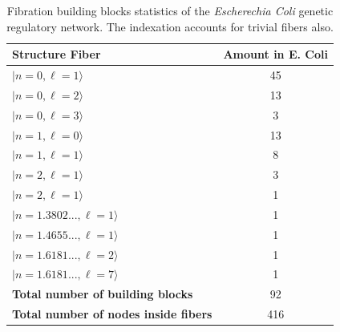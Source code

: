 \documentclass[12pt]{diazessay} %
\begin{document}
\begin{table}[H]
	\centering
	\begin{tabular}[b]{lc}\hline
		Structure Fiber & Amount in E. Coli  \\ \hline
		$| n = 0, \ell = 1 \rangle$ & 45 \\
		$| n = 0, \ell = 2 \rangle$ & 13 \\
		$| n = 0, \ell = 3 \rangle$ & 3 \\ 
		$| n = 1, \ell = 0 \rangle$ & 13 \\
		$| n = 1, \ell = 1 \rangle$ & 8 \\
		$| n = 2, \ell = 1 \rangle$ & 3 \\
		$| n = 2, \ell = 1 \rangle$ & 1 \\ 
		$| n = 1.3802..., \ell = 1 \rangle$ & 1 \\ 
		$| n = 1.4655..., \ell = 1 \rangle$ & 1 \\  
		$| n = 1.6181..., \ell = 2 \rangle$ & 1 \\ 
		$| n = 1.6181..., \ell = 7 \rangle$ & 1 \\ 
		\hline
		\textbf{Total number of building blocks} & 92 \\
		\hline
		\textbf{Total number of nodes inside fibers} & 416 \\
		\hline
	  \end{tabular}
	  \caption{Fibration building blocks statistics of the \textit{Escherechia Coli} genetic regulatory network. The indexation accounts for trivial fibers also.}
	  \label{tab:fiberstats}
\end{table}
\end{document}
